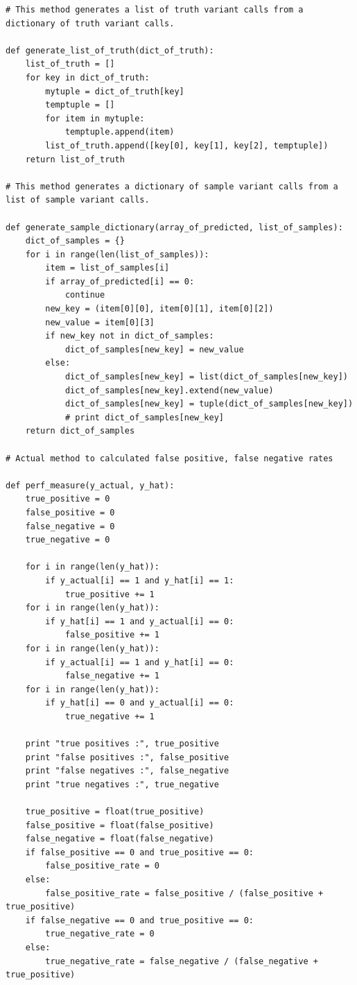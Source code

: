 \documentclass{article}
\begin{document}
\begin{verbatim}
# This method generates a list of truth variant calls from a dictionary of truth variant calls.

def generate_list_of_truth(dict_of_truth):
    list_of_truth = []
    for key in dict_of_truth:
        mytuple = dict_of_truth[key]
        temptuple = []
        for item in mytuple:
            temptuple.append(item)
        list_of_truth.append([key[0], key[1], key[2], temptuple])
    return list_of_truth

# This method generates a dictionary of sample variant calls from a list of sample variant calls.
	
def generate_sample_dictionary(array_of_predicted, list_of_samples):
    dict_of_samples = {}
    for i in range(len(list_of_samples)):
        item = list_of_samples[i]
        if array_of_predicted[i] == 0:
            continue
        new_key = (item[0][0], item[0][1], item[0][2])
        new_value = item[0][3]
        if new_key not in dict_of_samples:
            dict_of_samples[new_key] = new_value
        else:
            dict_of_samples[new_key] = list(dict_of_samples[new_key])
            dict_of_samples[new_key].extend(new_value)
            dict_of_samples[new_key] = tuple(dict_of_samples[new_key])
            # print dict_of_samples[new_key]
    return dict_of_samples

# Actual method to calculated false positive, false negative rates
	
def perf_measure(y_actual, y_hat):
    true_positive = 0
    false_positive = 0
    false_negative = 0
    true_negative = 0

    for i in range(len(y_hat)):
        if y_actual[i] == 1 and y_hat[i] == 1:
            true_positive += 1
    for i in range(len(y_hat)):
        if y_hat[i] == 1 and y_actual[i] == 0:
            false_positive += 1
    for i in range(len(y_hat)):
        if y_actual[i] == 1 and y_hat[i] == 0:
            false_negative += 1
    for i in range(len(y_hat)):
        if y_hat[i] == 0 and y_actual[i] == 0:
            true_negative += 1

    print "true positives :", true_positive
    print "false positives :", false_positive
    print "false negatives :", false_negative
    print "true negatives :", true_negative

    true_positive = float(true_positive)
    false_positive = float(false_positive)
    false_negative = float(false_negative)
    if false_positive == 0 and true_positive == 0:
        false_positive_rate = 0
    else:
        false_positive_rate = false_positive / (false_positive + true_positive)
    if false_negative == 0 and true_positive == 0:
        true_negative_rate = 0
    else:
        true_negative_rate = false_negative / (false_negative + true_positive)


\end{verbatim}
\end{document}

